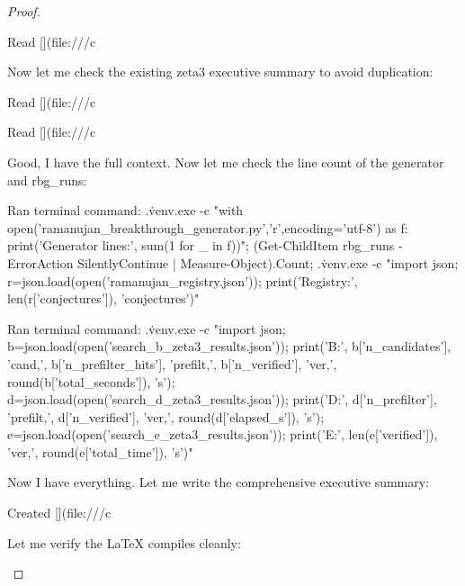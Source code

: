 \begin{theorem}
\begin{lemma}
\begin{proposition}
\begin{corollary}
\begin{proof}
\begin{remark}
Read [](file:///c%

Now let me check the existing zeta3 executive summary to avoid duplication: 

Read [](file:///c%

Read [](file:///c%

Good, I have the full context. Now let me check the line count of the generator and rbg_runs:    

Ran terminal command: .\.venv\Scripts\python.exe -c "with open('ramanujan_breakthrough_generator.py','r',encoding='utf-8') as f: print('Generator lines:', sum(1 for _ in f))"; (Get-ChildItem rbg_runs -ErrorAction SilentlyContinue | Measure-Object).Count; .\.venv\Scripts\python.exe -c "import json; r=json.load(open('ramanujan_registry.json')); print('Registry:', len(r['conjectures']), 'conjectures')"

Ran terminal command: .\.venv\Scripts\python.exe -c "import json; b=json.load(open('search_b_zeta3_results.json')); print('B:', b['n_candidates'], 'cand,', b['n_prefilter_hits'], 'prefilt,', b['n_verified'], 'ver,', round(b['total_seconds']), 's'); d=json.load(open('search_d_zeta3_results.json')); print('D:', d['n_prefilter'], 'prefilt,', d['n_verified'], 'ver,', round(d['elapsed_s']), 's'); e=json.load(open('search_e_zeta3_results.json')); print('E:', len(e['verified']), 'ver,', round(e['total_time']), 's')"

Now I have everything. Let me write the comprehensive executive summary:   

Created [](file:///c%

Let me verify the LaTeX compiles cleanly:    


\end{remark}
\end{proof}
\end{corollary}
\end{proposition}
\end{lemma}
\end{theorem}
